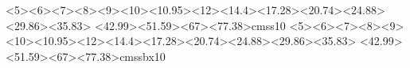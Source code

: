 \textwidth 16.7cm
\textheight 25cm
\topmargin -2.7cm
\oddsidemargin 0.25cm
\parindent 0pt
\pagestyle{empty}
%
%
%


%
%
%
%
%
%

% 
%
\newif\ifsupvismale
\supvismaletrue
%
\def\secondexaminer{Name of 2. examiner}
\newif\ifsecexmale
\secexmaletrue
%
%
%
%
\def\ifundefined#1{\expandafter\ifx\csname#1\endcsname\relax}
  {<5><6><7><8><9><10><10.95><12><14.4><17.28><20.74><24.88><29.86><35.83>%
   <42.99><51.59><67><77.38>cmss10}{}
  {<5><6><7><8><9><10><10.95><12><14.4><17.28><20.74><24.88><29.86><35.83>%
   <42.99><51.59><67><77.38>cmssbx10}{}
\makeatletter
\def\Huge{\@setfontsize\Huge{29.86pt}{36}}
\makeatother
%
\unitlength 1cm
\sffamily
